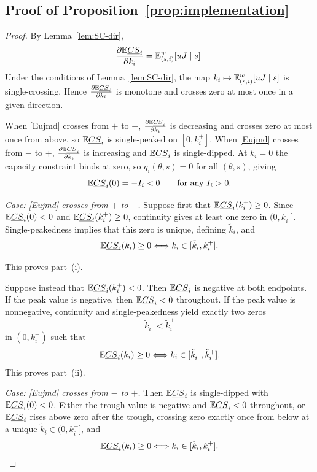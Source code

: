 \documentclass[master.tex]{subfiles}
\begin{document}
\subsection{Proof of Proposition~\ref{prop:implementation}}
\begin{proof}

By Lemma~\ref{lem:SC-dir},
\[
\frac{\partial \mathbb{E}\underline{CS}_i}{\partial k_i}
=
\mathbb{E}_{(s,i)}^w[uJ\mid s].
\]
Under the conditions of Lemma~\ref{lem:SC-dir}, the map $k_i\mapsto \mathbb{E}_{(s,i)}^w[uJ\mid s]$ is single-crossing. Hence $\frac{\partial \mathbb{E}\underline{CS}_i}{\partial k_i}$ is monotone and crosses zero at most once in a given direction.

When \eqref{Eujmd} crosses from $+$ to $-$, $\frac{\partial \mathbb{E}\underline{CS}_i}{\partial k_i}$ is decreasing and crosses zero at most once from above, so $\mathbb{E}\underline{CS}_i$ is single-peaked on $[0,k_i^+]$. When \eqref{Eujmd} crosses from $-$ to $+$, $\frac{\partial \mathbb{E}\underline{CS}_i}{\partial k_i}$ is increasing and $\mathbb{E}\underline{CS}_i$ is single-dipped. At $k_i=0$ the capacity constraint binds at zero, so $q_i(\theta,s)=0$ for all $(\theta,s)$, giving
\[
\mathbb{E}\underline{CS}_i(0)=-I_i<0
\qquad
\text{for any }I_i>0.
\]

\noindent\textit{Case: \eqref{Eujmd} crosses from $+$ to $-$.}
Suppose first that $\mathbb{E}\underline{CS}_i(k_i^+)\ge 0$. Since $\mathbb{E}\underline{CS}_i(0)<0$ and $\mathbb{E}\underline{CS}_i(k_i^+)\ge 0$, continuity gives at least one zero in $(0,k_i^+]$. Single-peakedness implies that this zero is unique, defining $\tilde k_i$, and
\[
\mathbb{E}\underline{CS}_i(k_i)\ge 0
\Longleftrightarrow
k_i\in[\tilde k_i,k_i^+].
\]

This proves part~(i).

Suppose instead that $\mathbb{E}\underline{CS}_i(k_i^+)<0$. Then $\mathbb{E}\underline{CS}_i$ is negative at both endpoints. If the peak value is negative, then $\mathbb{E}\underline{CS}_i<0$ throughout. If the peak value is nonnegative, continuity and single-peakedness yield exactly two zeros
\[
\tilde k_i^-<\tilde k_i^+
\]
in $(0,k_i^+)$ such that
\[
\mathbb{E}\underline{CS}_i(k_i)\ge 0
\Longleftrightarrow
k_i\in[\tilde k_i^-,\tilde k_i^+].
\]
This proves part~(ii).

\noindent\textit{Case: \eqref{Eujmd} crosses from $-$ to $+$.}
Then $\mathbb{E}\underline{CS}_i$ is single-dipped with $\mathbb{E}\underline{CS}_i(0)<0$. Either the trough value is negative and $\mathbb{E}\underline{CS}_i<0$ throughout, or $\mathbb{E}\underline{CS}_i$ rises above zero after the trough, crossing zero exactly once from below at a unique $\tilde k_i\in(0,k_i^+]$, and
\[
\mathbb{E}\underline{CS}_i(k_i)\ge 0
\Longleftrightarrow
k_i\in[\tilde k_i,k_i^+].
\]
\end{proof}
\end{document}
